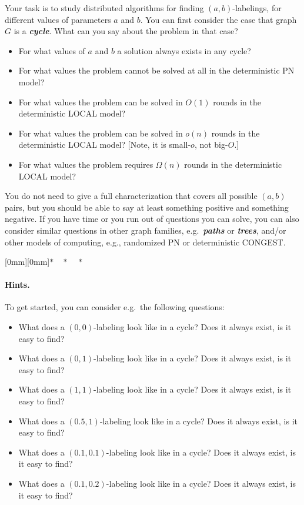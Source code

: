 \documentclass[12pt,a4paper]{article}
\newcommand{\sep}{{\centering \raisebox{-3mm}[0mm][0mm]{$*\quad*\quad*$}\par}}
\newcommand{\hl}[1]{\textbf{\emph{#1}}}
\begin{document}
Your task is to study distributed algorithms for finding $(a,b)$-labelings, for different values of parameters $a$ and $b$. You can first consider the case that graph $G$ is a \hl{cycle}. What can you say about the problem in that case?
\begin{itemize}
    \item For what values of $a$ and $b$ a solution always exists in any cycle?
    \item For what values the problem cannot be solved at all in the deterministic PN model?
    \item For what values the problem can be solved in $O(1)$ rounds in the deterministic LOCAL model?
    \item For what values the problem can be solved in $o(n)$ rounds in the deterministic LOCAL model? [Note, it is small-$o$, not big-$O$.]
    \item For what values the problem requires $\Omega(n)$ rounds in the deterministic LOCAL model?
\end{itemize}
You do not need to give a full characterization that covers all possible $(a,b)$ pairs, but you should be able to say at least something positive and something negative. If you have time or you run out of questions you can solve, you can also consider similar questions in other graph families, e.g.\ \hl{paths} or \hl{trees}, and/or other models of computing, e.g., randomized PN or deterministic CONGEST.

\sep

\paragraph{Hints.}

To get started, you can consider e.g.\ the following questions:
\begin{itemize}
    \item What does a $(0,0)$-labeling look like in a cycle? Does it always exist, is it easy to find?
    \item What does a $(0,1)$-labeling look like in a cycle? Does it always exist, is it easy to find?
    \item What does a $(1,1)$-labeling look like in a cycle? Does it always exist, is it easy to find?
    \item What does a $(0.5,1)$-labeling look like in a cycle? Does it always exist, is it easy to find?
    \item What does a $(0.1,0.1)$-labeling look like in a cycle? Does it always exist, is it easy to find?
    \item What does a $(0.1,0.2)$-labeling look like in a cycle? Does it always exist, is it easy to find?
\end{itemize}
\end{document}

